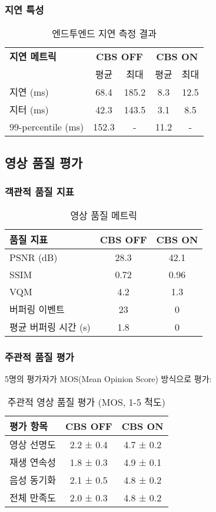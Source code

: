\documentclass[10pt,twocolumn]{IEEEtran}
\begin{document}
\subsubsection{지연 특성}

\begin{table}[h]
\centering
\caption{엔드투엔드 지연 측정 결과}
\begin{tabular}{lcccc}
\toprule
\textbf{지연 메트릭} & \multicolumn{2}{c}{\textbf{CBS OFF}} & \multicolumn{2}{c}{\textbf{CBS ON}} \\
\cmidrule(lr){2-3} \cmidrule(lr){4-5}
& 평균 & 최대 & 평균 & 최대 \\
\midrule
지연 (ms) & 68.4 & 185.2 & 8.3 & 12.5 \\
지터 (ms) & 42.3 & 143.5 & 3.1 & 8.5 \\
99-percentile (ms) & 152.3 & - & 11.2 & - \\
\bottomrule
\end{tabular}
\end{table}

\subsection{영상 품질 평가}

\subsubsection{객관적 품질 지표}

\begin{table}[h]
\centering
\caption{영상 품질 메트릭}
\begin{tabular}{lcc}
\toprule
\textbf{품질 지표} & \textbf{CBS OFF} & \textbf{CBS ON} \\
\midrule
PSNR (dB) & 28.3 & 42.1 \\
SSIM & 0.72 & 0.96 \\
VQM & 4.2 & 1.3 \\
버퍼링 이벤트 & 23 & 0 \\
평균 버퍼링 시간 (s) & 1.8 & 0 \\
\bottomrule
\end{tabular}
\end{table}

\subsubsection{주관적 품질 평가}
5명의 평가자가 MOS(Mean Opinion Score) 방식으로 평가:

\begin{table}[h]
\centering
\caption{주관적 영상 품질 평가 (MOS, 1-5 척도)}
\begin{tabular}{lcc}
\toprule
\textbf{평가 항목} & \textbf{CBS OFF} & \textbf{CBS ON} \\
\midrule
영상 선명도 & 2.2 ± 0.4 & 4.7 ± 0.2 \\
재생 연속성 & 1.8 ± 0.3 & 4.9 ± 0.1 \\
음성 동기화 & 2.1 ± 0.5 & 4.8 ± 0.2 \\
전체 만족도 & 2.0 ± 0.3 & 4.8 ± 0.2 \\
\bottomrule
\end{tabular}
\end{table}
\end{document}
